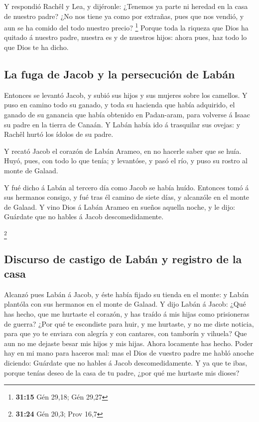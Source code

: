  Y respondió Rachêl y Lea, y dijéronle: ¿Tenemos ya parte
ni heredad en la casa de nuestro padre?  ¿No nos tiene ya
como por extrañas, pues que nos vendió, y aun se ha comido del todo
nuestro precio? \footnote{\textbf{31:15} Gén 29,18; Gén 29,27}
 Porque toda la riqueza que Dios ha quitado á nuestro
padre, nuestra es y de nuestros hijos: ahora pues, haz todo lo que Dios
te ha dicho.

\hypertarget{la-fuga-de-jacob-y-la-persecuciuxf3n-de-labuxe1n}{%
\subsection{La fuga de Jacob y la persecución de
Labán}\label{la-fuga-de-jacob-y-la-persecuciuxf3n-de-labuxe1n}}

 Entonces se levantó Jacob, y subió sus hijos y sus mujeres
sobre los camellos.  Y puso en camino todo su ganado, y
toda su hacienda que había adquirido, el ganado de su ganancia que había
obtenido en Padan-aram, para volverse á Isaac su padre en la tierra de
Canaán.  Y Labán había ido á trasquilar sus ovejas: y
Rachêl hurtó los ídolos de su padre.

 Y recató Jacob el corazón de Labán Arameo, en no hacerle
saber que se huía.  Huyó, pues, con todo lo que tenía; y
levantóse, y pasó el río, y puso su rostro al monte de Galaad.

 Y fué dicho á Labán al tercero día como Jacob se había
huído.  Entonces tomó á sus hermanos consigo, y fué tras él
camino de siete días, y alcanzóle en el monte de Galaad.  Y
vino Dios á Labán Arameo en sueños aquella noche, y le dijo: Guárdate
que no hables á Jacob descomedidamente.

\footnote{\textbf{31:24} Gén 20,3; Prov 16,7}

\hypertarget{discurso-de-castigo-de-labuxe1n-y-registro-de-la-casa}{%
\subsection{Discurso de castigo de Labán y registro de la
casa}\label{discurso-de-castigo-de-labuxe1n-y-registro-de-la-casa}}

 Alcanzó pues Labán á Jacob, y éste había fijado su tienda
en el monte: y Labán plantóla con sus hermanos en el monte de Galaad.
 Y dijo Labán á Jacob: ¿Qué has hecho, que me hurtaste el
corazón, y has traído á mis hijas como prisioneras de guerra?
 ¿Por qué te escondiste para huir, y me hurtaste, y no me
diste noticia, para que yo te enviara con alegría y con cantares, con
tamborín y vihuela?  Que aun no me dejaste besar mis hijos
y mis hijas. Ahora locamente has hecho.  Poder hay en mi
mano para haceros mal: mas el Dios de vuestro padre me habló anoche
diciendo: Guárdate que no hables á Jacob descomedidamente. 
Y ya que te ibas, porque tenías deseo de la casa de tu padre, ¿por qué
me hurtaste mis dioses?

